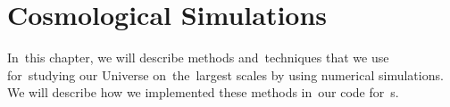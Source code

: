 \chapter{Cosmological Simulations}
\label{chpt:cosmo_sim}
In~this chapter, we will describe methods and~techniques that we use for~studying our Universe on~the~largest scales by using numerical simulations. We will describe how we implemented these methods in~our code for~\nbodysim s.


% 
% 

